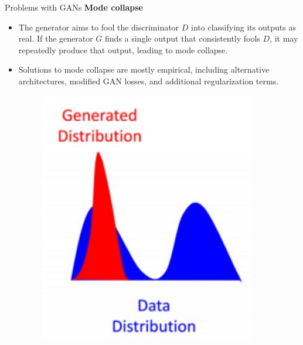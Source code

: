 \begin{frame}[allowframebreaks]{Problems with GANs}
\framebreak
\textbf{\large Mode collapse}
    \begin{itemize}
        \item The generator aims to fool the discriminator $D$ into classifying its outputs as real. If the generator $G$ finds a single output that consistently fools $D$, it may repeatedly produce that output, leading to mode collapse.
        \item Solutions to mode collapse are mostly empirical, including alternative architectures, modified GAN losses, and additional regularization terms.
        
        \begin{figure}
            \centering
            \includegraphics[height=0.4\textheight, width=\textwidth, keepaspectratio]{images/gan/gan_mode_collapse_1.png}
        \end{figure}
    \end{itemize}


\end{frame}
